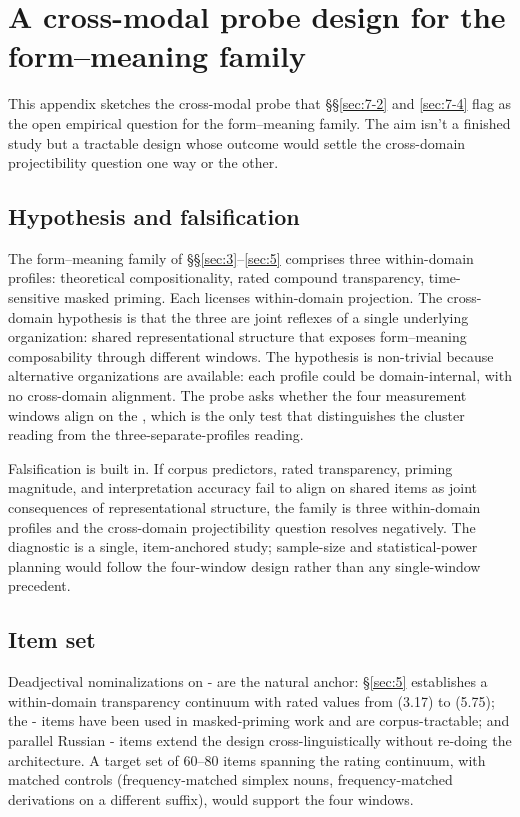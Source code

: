 \section{A cross-modal probe design for the form--meaning family}\label{sec:D}

This appendix sketches the cross-modal probe that §§\ref{sec:7-2} and \ref{sec:7-4} flag as the open empirical question for the form--meaning family. The aim isn't a finished study but a tractable design whose outcome would settle the cross-domain projectibility question one way or the other.

\subsection{Hypothesis and falsification}

The form--meaning family of §§\ref{sec:3}--\ref{sec:5} comprises three within-domain profiles: theoretical compositionality, rated compound transparency, time-sensitive masked priming. Each licenses within-domain projection. The cross-domain hypothesis is that the three are joint reflexes of a single underlying organization: shared representational structure that exposes form--meaning composability through different windows. The hypothesis is non-trivial because alternative organizations are available: each profile could be domain-internal, with no cross-domain alignment. The probe asks whether the four measurement windows align on the , which is the only test that distinguishes the cluster reading from the three-separate-profiles reading.

Falsification is built in. If corpus predictors, rated transparency, priming magnitude, and interpretation accuracy fail to align on shared items as joint consequences of representational structure, the family is three within-domain profiles and the cross-domain projectibility question resolves negatively. The diagnostic is a single, item-anchored study; sample-size and statistical-power planning would follow the four-window design rather than any single-window precedent.

\subsection{Item set}

Deadjectival nominalizations on - are the natural anchor: §\ref{sec:5} establishes a within-domain transparency continuum with rated values from  (3.17) to  (5.75); the - items have been used in masked-priming work and are corpus-tractable; and parallel Russian - items extend the design cross-linguistically without re-doing the architecture. A target set of 60--80 items spanning the rating continuum, with matched controls (frequency-matched simplex nouns, frequency-matched derivations on a different suffix), would support the four windows.

